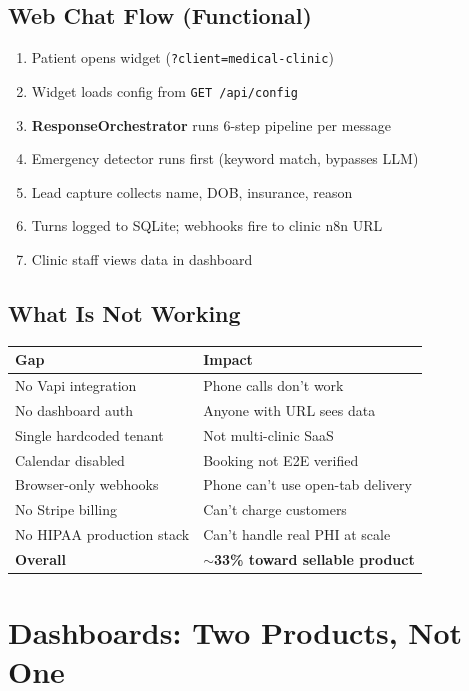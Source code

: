 \documentclass[11pt,a4paper]{article}
\begin{document}
\subsection{Web Chat Flow (Functional)}
\begin{enumerate}[nosep]
  \item Patient opens widget (\texttt{?client=medical-clinic})
  \item Widget loads config from \texttt{GET /api/config}
  \item \textbf{ResponseOrchestrator} runs 6-step pipeline per message
  \item Emergency detector runs first (keyword match, bypasses LLM)
  \item Lead capture collects name, DOB, insurance, reason
  \item Turns logged to SQLite; webhooks fire to clinic n8n URL
  \item Clinic staff views data in dashboard
\end{enumerate}

\subsection{What Is Not Working}
\begin{center}
\small
\begin{tabular}{@{}ll@{}}
\toprule
\textbf{Gap} & \textbf{Impact} \\
\midrule
No Vapi integration & Phone calls don't work \\
No dashboard auth & Anyone with URL sees data \\
Single hardcoded tenant & Not multi-clinic SaaS \\
Calendar disabled & Booking not E2E verified \\
Browser-only webhooks & Phone can't use open-tab delivery \\
No Stripe billing & Can't charge customers \\
No HIPAA production stack & Can't handle real PHI at scale \\
\midrule
\textbf{Overall} & \textbf{$\sim$33\% toward sellable product} \\
\bottomrule
\end{tabular}
\end{center}

\section{Dashboards: Two Products, Not One}
\end{document}
